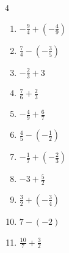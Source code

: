 \begin{multicols}{4}
\begin{enumerate}

  \item $\displaystyle -\frac{9}{4} + \left(-\frac{4}{9}\right)$


  \item $\displaystyle \frac{7}{4} - \left(-\frac{3}{5}\right)$


  \item $\displaystyle -\frac{2}{3} + 3$


  \item $\displaystyle \frac{7}{6} + \frac{2}{3}$


\columnbreak %

  \item $\displaystyle -\frac{4}{9} + \frac{6}{7}$


  \item $\displaystyle \frac{4}{5} - \left(-\frac{1}{2}\right)$


  \item $\displaystyle -\frac{1}{7} + \left(-\frac{2}{3}\right)$


  \item $\displaystyle -3 + \frac{5}{2}$


  \item $\displaystyle \frac{3}{2} + \left(-\frac{3}{4}\right)$


  \item $\displaystyle 7 - \left(-2\right)$

        \phantom{$\displaystyle =9$}

  \item $\displaystyle \frac{10}{7} + \frac{3}{2}$



\end{enumerate}
\end{multicols}
